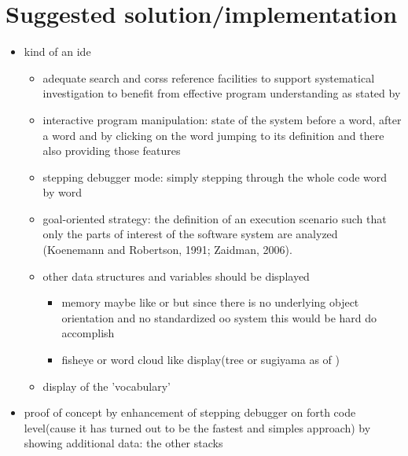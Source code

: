 \chapter{Suggested solution/implementation}

\begin{itemize}
\item kind of an ide
	\begin{itemize}
	\item adequate search and corss reference facilities to support systematical investigation to benefit from effective program understanding as stated by \cite{Robillard:2004:EDI:1042203.1042417}
	\item interactive program manipulation: state of the system before a word, after a word and by clicking on the word jumping to its definition and there also providing those features
	\item stepping debugger mode: simply stepping through the whole code word by word
	\item goal-oriented strategy: the definition of an execution scenario such that only the parts of interest of the software system are analyzed (Koenemann and Robertson, 1991; Zaidman,
	2006).
	\item other data structures and variables should be displayed
		\begin{itemize}
		\item memory maybe like \cite{ReissProgrammingEnvironments1995} or \cite{Aftandilian:2010:HIH:1879211.1879222} but since there is no underlying object orientation and no standardized oo system this would be hard do accomplish
		\item fisheye or word cloud like display(tree or sugiyama as of \cite{Storey:1997:IVT:857188.857642})
		\end{itemize}
	\item display of the 'vocabulary'
	\end{itemize}
\item proof of concept by enhancement of stepping debugger on forth code level(cause it has turned out to be the fastest and simples approach) by showing additional data: the other stacks
\end{itemize}